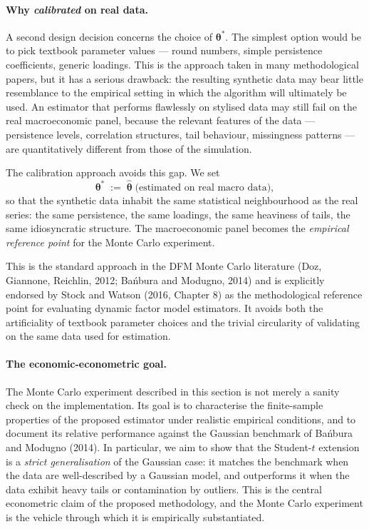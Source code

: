 \documentclass[11pt, a4paper, oneside]{article}
\newcommand{\btheta}{\boldsymbol{\theta}}
\begin{document}
\paragraph{Why \emph{calibrated} on real data.}
A second design decision concerns the choice of $\btheta^*$. The
simplest option would be to pick textbook parameter values — round
numbers, simple persistence coefficients, generic loadings. This is
the approach taken in many methodological papers, but it has a
serious drawback: the resulting synthetic data may bear little
resemblance to the empirical setting in which the algorithm will
ultimately be used. An estimator that performs flawlessly on
stylised data may still fail on the real macroeconomic panel,
because the relevant features of the data — persistence levels,
correlation structures, tail behaviour, missingness patterns — are
quantitatively different from those of the simulation.

The calibration approach avoids this gap. We set
\[
\btheta^* \;:=\; \hat{\btheta}\;\text{(estimated on real macro data)},
\]
so that the synthetic data inhabit the same statistical neighbourhood
as the real series: the same persistence, the same loadings, the same
heaviness of tails, the same idiosyncratic structure. The
macroeconomic panel becomes the \emph{empirical reference point} for
the Monte Carlo experiment.

This is the standard approach in the DFM Monte Carlo literature
(Doz, Giannone, Reichlin, 2012; Ba\'nbura and Modugno, 2014) and is
explicitly endorsed by Stock and Watson (2016, Chapter 8) as the
methodological reference point for evaluating dynamic factor model
estimators. It avoids both the artificiality of textbook parameter
choices and the trivial circularity of validating on the same data
used for estimation.

\paragraph{The economic-econometric goal.}
The Monte Carlo experiment described in this section is not merely a
sanity check on the implementation. Its goal is to characterise the
finite-sample properties of the proposed estimator under realistic
empirical conditions, and to document its relative performance
against the Gaussian benchmark of Ba\'nbura and Modugno (2014). In
particular, we aim to show that the Student-$t$ extension is a
\emph{strict generalisation} of the Gaussian case: it matches the
benchmark when the data are well-described by a Gaussian model, and
outperforms it when the data exhibit heavy tails or contamination by
outliers. This is the central econometric claim of the proposed
methodology, and the Monte Carlo experiment is the vehicle through
which it is empirically substantiated.
\end{document}
